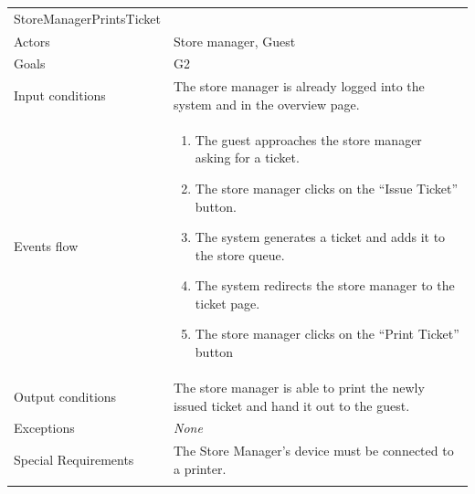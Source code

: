 \clearpage
\begin{longtable}[]{@{}
  >{\raggedright\arraybackslash}p{}
  >{\raggedright\arraybackslash}p{}@{}}
\toprule
StoreManagerPrintsTicket & \\ \addlinespace
\midrule
\endhead
Actors & Store manager, Guest \\ \addlinespace
Goals & G2 \\ \addlinespace
Input conditions & The store manager is already logged into the system and in the overview page. \\ \addlinespace
Events flow & \begin{enumerate}\vspace{-1.35\baselineskip}
    \item The guest approaches the store manager asking for a ticket.
    \item The store manager clicks on the ``Issue Ticket'' button.
    \item The system generates a ticket and adds it to the store queue.
    \item The system redirects the store manager to the ticket page.
    \item The store manager clicks on the ``Print Ticket'' button 
\vspace{-1.0\baselineskip}\end{enumerate} \\ \addlinespace
Output conditions & The store manager is able to print the newly issued ticket and hand it out to the guest. \\ \addlinespace
Exceptions & \emph{None} \\ \addlinespace
Special Requirements & The Store Manager's device must be connected to a printer. \\ \addlinespace
\bottomrule
\end{longtable}


